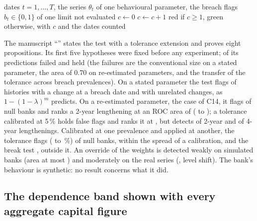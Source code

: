 \begin{algorithm}[htbp]
\caption{Count of the dates at which a behavioural parameter changed during a breach.}
\label{alg:bs8}
\begin{algorithmic}[1]
\Require dates $t=1,\dots,T$, the series $\theta_{t}$ of one behavioural parameter, the breach flags $b_{t}\in\{0,1\}$ of one limit
 \Return not evaluated \EndIf
\State $c\gets 0$
   \State $c\gets c+1$ \EndIf
\EndFor
\State \Return red if $c\ge 1$, green otherwise, with $c$ and the dates counted
\end{algorithmic}
\end{algorithm}

The manuscript ``\pxPaperTitleEight{}'' states the test with a tolerance extension and proves eight propositions. Its first five hypotheses were fixed before any experiment; \pxPpEightRefuted{} of its
predictions failed and \pxPpEightHeld{} held (the failures are the conventional size on a stated parameter, the area of 0.70 on re-estimated parameters, and the transfer of the tolerance across breach
prevalences). On a stated parameter the test flags \pxPpEightStatedAlt{} of histories with a change at a breach date and \pxPpEightStatedNull{} with unrelated changes, as $1-(1-\lambda)^{m}$ predicts.
On a re-estimated parameter, the case of C14, it flags \pxPpEightFitNull{} of null banks and ranks a 2-year lengthening at an ROC area of \pxPpEightFitAuc{} (\pxPpEightFitAucLo{} to \pxPpEightFitAucHi{});
a tolerance calibrated at 5\,\% holds \pxPpEightTolNull{} false flags and ranks it at \pxPpEightTolAuc{}, but detects \pxPpEightTolTwo{} of 2-year and \pxPpEightTolFour{} of 4-year lengthenings. Calibrated
at one prevalence and applied at another, the tolerance flags \pxPpEightMisTol{} (\pxPpEightMisTolLo{} to \pxPpEightMisTolHi{}\,\%) of null banks, within the spread of a calibration, and the break test
\pxPpEightMisBreak{}, outside it. An override of the weights is detected weakly on simulated banks (area at most \pxPpEightWTop{}) and moderately on the real series (\pxPpEightWReal{}, level shift). The bank's
behaviour is synthetic: no result concerns what it did.

\subsection{The dependence band shown with every aggregate capital figure}
\label{sec:bs9}

